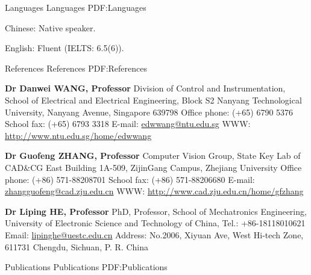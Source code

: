\documentclass[letterpaper,MMMyyyy,nonstopmode]{simpleresumecv}
\begin{document}
\begin{Body}

\Section
{Languages}
{Languages}
{PDF:Languages}

\BulletItem
Chinese: Native speaker.

\Gap
\BulletItem
English: Fluent (IELTS: 6.5(6)).



\Section
{References}
{References}
{PDF:References}

\Gap
\BulletItem
\textbf{Dr Danwei WANG, Professor}
\newline
Division of Control and Instrumentation,
School of Electrical and Electrical Engineering, Block S2
\newline
Nanyang Technological University,
Nanyang Avenue, Singapore 639798
\newline
Office phone: (+65) 6790 5376
\newline
School fax: (+65) 6793 3318
\newline
E-mail: \url{edwwang@ntu.edu.sg}
\newline
WWW: \url{http://www.ntu.edu.sg/home/edwwang}


\BulletItem
\textbf{Dr Guofeng ZHANG, Professor}
\newline
Computer Vision Group, State Key Lab of CAD\&CG
\newline
East Building 1A-509, ZijinGang Campus, Zhejiang University
\newline
Office phone: (+86) 571-88208701
\newline
School fax: (+86) 571-88206680
\newline
E-mail: \url{zhangguofeng@cad.zju.edu.cn}
\newline
WWW: \url{http://www.cad.zju.edu.cn/home/gfzhang}


\Gap
\BulletItem
\textbf{Dr Liping HE, Professor}
\newline
PhD, Professor, School of Mechatronics Engineering,
\newline
University of Electronic Science and Technology of China,
\newline
Tel.: +86-18118010621
\newline
Email: \url{lipinghe@uestc.edu.cn}
\newline
Address: No.2006, Xiyuan Ave, West Hi-tech Zone, 611731 Chengdu, Sichuan, P. R. China


\Section
{Publications}
{Publications}
{PDF:Publications}

\begingroup
\renewcommand{\MaxNumberedItem}{[88]}

\nocite{*}



\endgroup


\end{Body}


\UseNoteFont%
\null\hfill%
\end{document}
